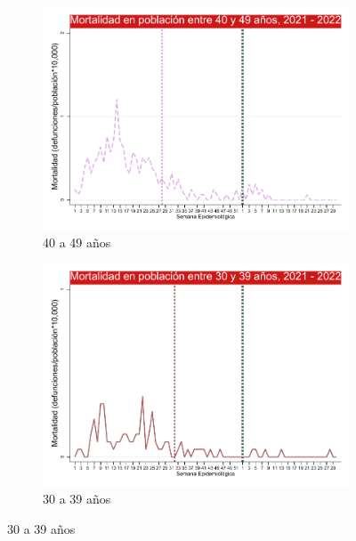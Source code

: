 \documentclass[xcolor=table]{beamer}
\begin{document}
\begin{frame}
\begin{figure}
\begin{subfigure}[b]{0.3\textwidth}
	\includegraphics[width=\textwidth]{../figuras/mortalidad_edad_40.pdf}
	\caption{40 a 49 años}
\end{subfigure}
\hfill
\begin{subfigure}[b]{0.3\textwidth}
	\centering
	\includegraphics[width=\textwidth]{../figuras/mortalidad_edad_30.pdf}
	\caption{30 a 39 años}
\end{subfigure}

\end{figure}
\end{frame}
\end{document}
